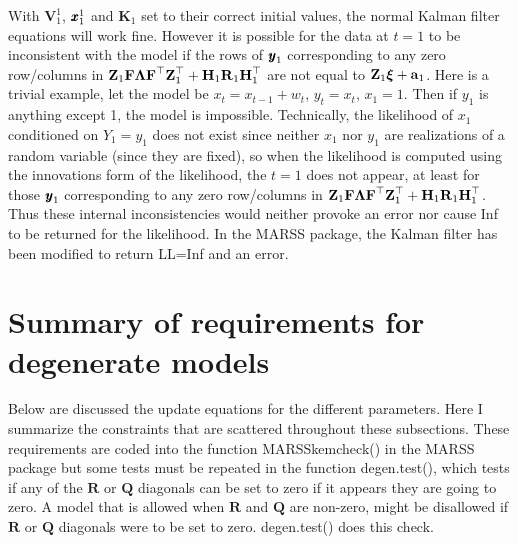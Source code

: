 \documentclass[]{article}
\def\xixi{\mbox{\boldmath $\xi$}}
\def\LAM{\mbox{\boldmath $\Lambda$}}
\def\ZZ{\mbox{$\mathbf Z$}}	\def\zz{\mbox{$\mathbf z$}}
\def\FF{\mbox{$\mathbf F$}} \def\ff{\mbox{$\mathbf f$}}
\def\HH{\mbox{$\mathbf H$}}	\def\hh{\mbox{$\mathbf h$}}
\def\KK{\mbox{$\mathbf K$}}
\def\QQ{\mbox{$\mathbf Q$}}	 \def\qq{\mbox{$\mathbf q$}}
\def\RR{\mbox{$\mathbf R$}}	 \def\rr{\mbox{$\mathbf r$}}
\def\VV{\mbox{$\pmb{V}$}}	\def\vv{\mbox{$\pmb{v}$}}
\begin{document}
With $\VV_1^1$, $\mbox{$\pmb{x}$}_1^1$ and $\KK_1$ set to their correct initial values, the normal Kalman filter equations will work fine.  However it is possible for the data at $t=1$ to be inconsistent with the model if the rows of $\mbox{$\pmb{y}$}_1$ corresponding to any zero row/columns in $\ZZ_1\FF\LAM\FF^\top\ZZ_1^\top+\HH_1\RR_1\HH_1^\top$ are not equal to $\ZZ_1\xixi + \aa_1$.  Here is a trivial example, let the model be $x_t=x_{t-1}+w_t$, $y_t=x_t$, $x_1=1$.  Then if $y_1$ is anything except 1, the model is impossible.  Technically, the likelihood of $x_1$ conditioned on $Y_1=y_1$ does not exist since neither $x_1$ nor $y_1$ are realizations of a random variable (since they are fixed), so when the likelihood is computed using the innovations form of the likelihood, the $t=1$ does not appear, at least for those $\mbox{$\pmb{y}$}_1$ corresponding to any zero row/columns in $\ZZ_1\FF\LAM\FF^\top\ZZ_1^\top+\HH_1\RR_1\HH_1^\top$.  Thus these internal inconsistencies would neither provoke an error nor cause Inf to be returned for the likelihood.  In the MARSS package, the Kalman filter has been modified to return LL=Inf and an error.

\section{Summary of requirements for degenerate models}
Below are discussed the update equations for the different parameters.  Here I summarize the constraints that are scattered throughout these subsections.  These requirements are coded into the function MARSSkemcheck() in the MARSS package but some tests must be repeated in the function degen.test(), which tests if any of the $\RR$ or $\QQ$ diagonals can be set to zero if it appears they are going to zero.  A model that is allowed when $\RR$ and $\QQ$ are non-zero, might be disallowed if $\RR$ or $\QQ$ diagonals were to be set to zero.  degen.test() does this check.
\end{document}
